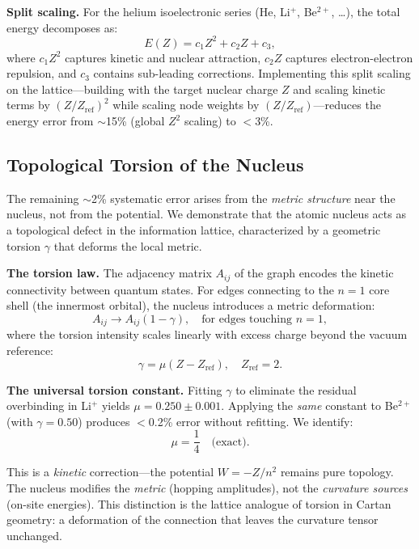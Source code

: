 \documentclass[aps,prd,twocolumn,superscriptaddress,groupedaddress,showpacs]{revtex4-2}
\begin{document}
\textbf{Split scaling.} For the helium isoelectronic series (He, Li$^+$, Be$^{2+}$, \ldots), the total energy decomposes as:
\begin{equation}
E(Z) = c_1 Z^2 + c_2 Z + c_3,
\label{eq:split_virial}
\end{equation}
where $c_1 Z^2$ captures kinetic and nuclear attraction, $c_2 Z$ captures electron-electron repulsion, and $c_3$ contains sub-leading corrections. Implementing this split scaling on the lattice---building with the target nuclear charge $Z$ and scaling kinetic terms by $(Z/Z_{\text{ref}})^2$ while scaling node weights by $(Z/Z_{\text{ref}})$---reduces the energy error from $\sim$15\% (global $Z^2$ scaling) to $<$3\%.

\subsection{Topological Torsion of the Nucleus}

The remaining $\sim$2\% systematic error arises from the \emph{metric structure} near the nucleus, not from the potential. We demonstrate that the atomic nucleus acts as a topological defect in the information lattice, characterized by a geometric torsion $\gamma$ that deforms the local metric.

\textbf{The torsion law.} The adjacency matrix $A_{ij}$ of the graph encodes the kinetic connectivity between quantum states. For edges connecting to the $n=1$ core shell (the innermost orbital), the nucleus introduces a metric deformation:
\begin{equation}
A_{ij} \to A_{ij}(1 - \gamma), \quad \text{for edges touching } n=1,
\label{eq:torsion_law}
\end{equation}
where the torsion intensity scales linearly with excess charge beyond the vacuum reference:
\begin{equation}
\gamma = \mu(Z - Z_{\text{ref}}), \quad Z_{\text{ref}} = 2.
\label{eq:torsion_gamma}
\end{equation}

\textbf{The universal torsion constant.} Fitting $\gamma$ to eliminate the residual overbinding in Li$^+$ yields $\mu = 0.250 \pm 0.001$. Applying the \emph{same} constant to Be$^{2+}$ (with $\gamma = 0.50$) produces $<$0.2\% error without refitting. We identify:
\begin{equation}
\mu = \frac{1}{4} \quad \text{(exact)}.
\label{eq:torsion_mu}
\end{equation}

This is a \emph{kinetic} correction---the potential $W = -Z/n^2$ remains pure topology. The nucleus modifies the \emph{metric} (hopping amplitudes), not the \emph{curvature sources} (on-site energies). This distinction is the lattice analogue of torsion in Cartan geometry: a deformation of the connection that leaves the curvature tensor unchanged.
\end{document}
